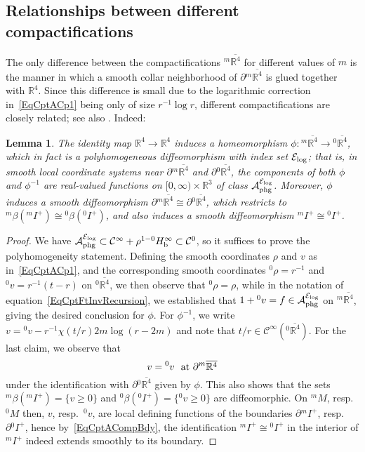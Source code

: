 \documentclass[reqno,11pt,letterpaper]{amsart}
\numberwithin{equation}{section}
\numberwithin{figure}{section}
\newtheorem{lemma}[thm]{Lemma}
\theoremstyle{definition}
\theoremstyle{remark}
\newcommand{\mc}{\mathcal}
\newcommand{\cA}{\mc A}
\newcommand{\cC}{\mc C}
\newcommand{\cE}{\mc E}
\newcommand{\R}{\mathbb{R}}
\newcommand{\ol}{\overline}
\newcommand{\pa}{\partial}
\newcommand{\tn}{\textnormal}
\newcommand{\bop}{{\mathrm{b}}}
\newcommand{\CI}{\cC^\infty}
\newcommand{\Hb}{H_{\bop}}
\newcommand{\phg}{{\mathrm{phg}}}
\begin{document}
\subsection{Relationships between different compactifications}
\label{SsCptM}

The only difference between the compactifications ${}^m\ol{\R^4}$ for different values of $m$ is the manner in which a smooth collar neighborhood of $\pa{}^m\ol{\R^4}$ is glued together with $\R^4$. Since this difference is small due to the logarithmic correction in~\eqref{EqCptACp1} being only of size $r^{-1}\log r$, different compactifications are closely related; see also \cite[\S7]{BaskinVasyWunschRadMink2}. Indeed:

\begin{lemma}
\label{LemmaCptAComp}
  The identity map $\R^4\to\R^4$ induces a homeomorphism $\phi\colon{}^m\ol{\R^4}\to{}^0\ol{\R^4}$, which in fact is a polyhomogeneous diffeomorphism with index set $\cE_{\rm log}$; that is, in smooth local coordinate systems near $\pa{}^m\ol{\R^4}$ and $\pa{}^0\ol{\R^4}$, the components of both $\phi$ and $\phi^{-1}$ are real-valued functions on $[0,\infty)\times\R^3$ of class $\cA_\phg^{\cE_{\rm log}}$. Moreover, $\phi$ induces a smooth diffeomorphism $\pa{}^m\ol{\R^4}\cong\pa{}^0\ol{\R^4}$, which restricts to ${}^m\beta({}^m I^+)\cong{}^0\beta({}^0 I^+)$, and also induces a smooth diffeomorphism ${}^m I^+\cong{}^0 I^+$.
\end{lemma}
\begin{proof}
  We have $\cA_\phg^{\cE_{\rm log}}\subset\CI+\rho^{1-0}\Hb^\infty\subset\cC^0$, so it suffices to prove the polyhomogeneity statement. Defining the smooth coordinates $\rho$ and $v$ as in~\eqref{EqCptACp1}, and the corresponding smooth coordinates ${}^0\rho=r^{-1}$ and ${}^0 v=r^{-1}(t-r)$ on ${}^0\ol{\R^4}$, we then observe that ${}^0\rho=\rho$, while in the notation of equation~\eqref{EqCptFtInvRecursion}, we established that $1+{}^0 v=f\in\cA_\phg^{\cE_{\rm log}}$ on ${}^m\ol{\R^4}$, giving the desired conclusion for $\phi$. For $\phi^{-1}$, we write $v={}^0 v-r^{-1}\chi(t/r)2 m\log(r-2 m)$ and note that $t/r\in\CI({}^0\ol{\R^4})$. For the last claim, we observe that
  \begin{equation}
  \label{EqCptACompBdy}
    v={}^0 v\ \ \tn{at}\ \pa{}^m\ol{\R^4}
  \end{equation}
  under the identification with $\pa{}^0\ol{\R^4}$ given by $\phi$. This also shows that the sets ${}^m\beta({}^m I^+)=\{v\geq 0\}$ and ${}^0\beta({}^0 I^+)=\{{}^0 v\geq 0\}$ are diffeomorphic. On ${}^m\!M$, resp.\ ${}^0\!M$ then, $v$, resp.\ ${}^0 v$, are local defining functions of the boundaries $\pa{}^m I^+$, resp.\ $\pa{}^0 I^+$, hence by~\eqref{EqCptACompBdy}, the identification ${}^m I^+\cong{}^0 I^+$ in the interior of ${}^m I^+$ indeed extends smoothly to its boundary.
\end{proof}
\end{document}
